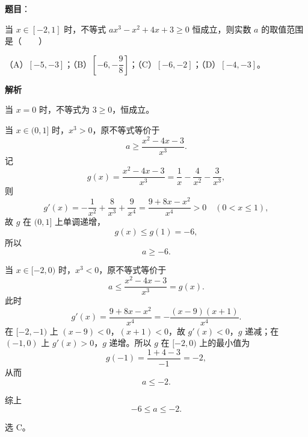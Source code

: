\begin{answer}

\textbf{题目}：

当 $x\in[-2,1]$ 时，不等式 $ax^3-x^2+4x+3\geqslant 0$ 恒成立，则实数 $a$ 的取值范围是\mbox{（　　）}

（A）$[-5,-3]$；（B）$\left[-6,-\dfrac98\right]$；（C）$[-6,-2]$；（D）$[-4,-3]$。

\textbf{解析}

当 $x=0$ 时，不等式为 $3\geqslant0$，恒成立。

当 $x\in(0,1]$ 时，$x^3>0$，原不等式等价于
\nopagebreak[4]
\[a\geqslant\frac{x^2-4x-3}{x^3}.\]
记
\nopagebreak[4]
\[g(x)=\frac{x^2-4x-3}{x^3}=\frac1x-\frac4{x^2}-\frac3{x^3},\]
则
\nopagebreak[4]
\[g'(x)=-\frac1{x^2}+\frac8{x^3}+\frac9{x^4}
=\frac{9+8x-x^2}{x^4}>0\quad(0<x\leqslant1),\]
故 $g$ 在 $(0,1]$ 上单调递增，
\nopagebreak[4]
\[g(x)\leqslant g(1)=-6,\]
所以
\nopagebreak[4]
\[a\geqslant-6.\]

当 $x\in[-2,0)$ 时，$x^3<0$，原不等式等价于
\nopagebreak[4]
\[a\leqslant\frac{x^2-4x-3}{x^3}=g(x).\]
此时
\nopagebreak[4]
\[g'(x)=\frac{9+8x-x^2}{x^4}=-\frac{(x-9)(x+1)}{x^4}.\]
在 $[-2,-1)$ 上 $(x-9)<0$，$(x+1)<0$，故 $g'(x)<0$，$g$ 递减；在 $(-1,0)$ 上 $g'(x)>0$，$g$ 递增。所以 $g$ 在 $[-2,0)$ 上的最小值为
\nopagebreak[4]
\[g(-1)=\frac{1+4-3}{-1}=-2,\]
从而
\nopagebreak[4]
\[a\leqslant-2.\]

综上
\nopagebreak[4]
\[-6\leqslant a\leqslant-2.\]

选 C。


\end{answer}
